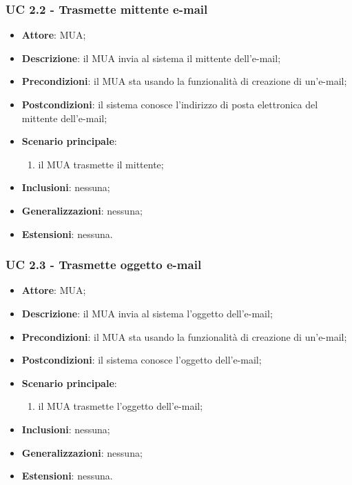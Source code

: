     \subsubsection{UC 2.2 - Trasmette mittente e-mail} \label{sec:UC2.2}
    \begin{itemize}
        \item \textbf{Attore}: MUA;
        \item \textbf{Descrizione}: il MUA invia al sistema il mittente dell'e-mail;
        \item \textbf{Precondizioni}: il MUA sta usando la funzionalità di creazione di un'e-mail;
        \item \textbf{Postcondizioni}: il sistema conosce l'indirizzo di posta elettronica del mittente dell'e-mail;
        \item \textbf{Scenario principale}:
            \begin{enumerate}
                \item il MUA trasmette il mittente;
            \end{enumerate}
        \item \textbf{Inclusioni}: nessuna;
        \item \textbf{Generalizzazioni}: nessuna;
        \item \textbf{Estensioni}: nessuna.
    \end{itemize}

    \subsubsection{UC 2.3 - Trasmette oggetto e-mail} \label{sec:UC2.3}
    \begin{itemize}
        \item \textbf{Attore}: MUA;
        \item \textbf{Descrizione}: il MUA invia al sistema l'oggetto dell'e-mail;
        \item \textbf{Precondizioni}: il MUA sta usando la funzionalità di creazione di un'e-mail;
        \item \textbf{Postcondizioni}: il sistema conosce l'oggetto dell'e-mail;
        \item \textbf{Scenario principale}:
            \begin{enumerate}
                \item il MUA trasmette l'oggetto dell'e-mail;
            \end{enumerate}
        \item \textbf{Inclusioni}: nessuna;
        \item \textbf{Generalizzazioni}: nessuna;
        \item \textbf{Estensioni}: nessuna.
    \end{itemize}

